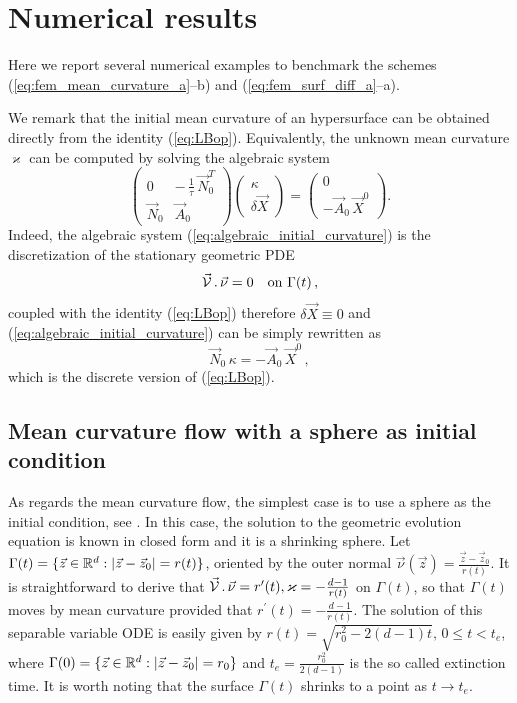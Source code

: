\section{Numerical results}\label{sec:geometric_pdes_results}
Here we report several numerical examples to benchmark the schemes
(\ref{eq:fem_mean_curvature_a}--b) and (\ref{eq:fem_surf_diff_a}--a).

We remark that the initial mean curvature of an hypersurface can be obtained
directly from the identity (\ref{eq:LBop}). Equivalently, the unknown
mean curvature $\varkappa$ can be computed by solving the algebraic system
\begin{equation}\label{eq:algebraic_initial_curvature}
\begin{pmatrix}
0 & -\,\frac{1}{\tau} \, \vec{N}_{0}^{T} \\
\vec{N}_0 & \vec{A}_0
\end{pmatrix}
\begin{pmatrix}
\kappa \\
\delta \vec X
\end{pmatrix}
=
\begin{pmatrix}
0 \\
- \vec{A}_0 \, \vec{X}^{0}
\end{pmatrix}
.
\end{equation}
Indeed, the algebraic system (\ref{eq:algebraic_initial_curvature}) is the
discretization of the stationary geometric PDE
\begin{equation}
\vec{\mathcal{V}}\,.\,\vec\nu=0\quad\mbox{on }\Gamma(t)\,,
\end{equation}
coupled with the identity (\ref{eq:LBop}) therefore $\delta\vec X \equiv 0$ and
(\ref{eq:algebraic_initial_curvature}) can be simply rewritten as
\begin{equation}
\vec{N}_0\,\kappa=- \vec{A}_0 \, \vec{X}^{0}\,,
\end{equation}
which is the discrete version of (\ref{eq:LBop}).

\subsection{Mean curvature flow with a sphere as initial condition}
\label{subsec:mc_sphere}
As regards the mean curvature flow, the simplest case is to use a sphere as the
initial condition, see \cite{Ilmanen98}. In this case, the solution to the
geometric evolution equation is known in closed form and it is a shrinking
sphere. Let $\Gamma(t) = \{ \vec z \in {\mathbb R}^d : |\vec z -\vec z_0| = r(t) \}$,
oriented by the outer normal $\vec \nu(\vec{z}) = \frac{\vec z - \vec
z_0}{r(t)}$. It is straightforward to derive that
$\vec{\mathcal{V}}\,.\,\vec\nu = r^{\prime}(t), \varkappa = - \frac{d -
1}{r(t)}$ on $\Gamma(t)$, so that $\Gamma(t)$ moves by mean curvature provided
that $r^{\prime}(t) = - \frac{d - 1}{r(t)}$. The solution of this separable
variable ODE is easily given by $r(t) = \sqrt{r_0^2 - 2(d - 1)t}, \, 0 \leq t <
t_e$, where $\Gamma(0) = \{ \vec z \in {\mathbb R}^d : |\vec z -\vec z_0| = r_0 \}$ and
$t_e=\frac{r_0^2}{2(d - 1)}$ is the so called extinction time. It is worth
noting that the surface $\Gamma(t)$ shrinks to a point as $t \rightarrow t_e$.

